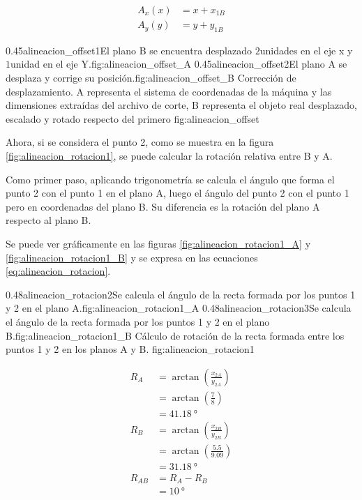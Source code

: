    \begin{equation}
      \begin{aligned}
         A_x(x) &= x+x_{1B} \\
         A_y(y) &= y+y_{1B}
      \end{aligned}
      \label{eq:alineacion_offset}
   \end{equation}

\subfigab
         {0.45}{alineacion_offset1}{El plano B se encuentra desplazado $2$unidades en el eje x y $1$unidad en el eje Y.}{fig:alineacion_offset_A}
         {0.45}{alineacion_offset2}{El plano A se desplaza y corrige su posición.}{fig:alineacion_offset_B}
         {Corrección de desplazamiento. A representa el sistema de coordenadas de la máquina y las dimensiones extraídas del archivo de corte, B representa el objeto real desplazado, escalado y rotado respecto del primero}
         {fig:alineacion_offset}

         Ahora, si se considera el punto 2, como se muestra en la figura \ref{fig:alineacion_rotacion1}, se puede calcular la rotación relativa entre B y A.\par
         Como primer paso, aplicando trigonometría se calcula el ángulo que forma el punto 2 con el punto 1 en el plano A, luego el ángulo del punto 2 con el punto 1 pero en coordenadas del plano B.
         Su diferencia es la rotación del plano A respecto al plano B.\par
         Se puede ver gráficamente en las figuras \ref{fig:alineacion_rotacion1_A} y \ref{fig:alineacion_rotacion1_B} y se expresa en las ecuaciones \ref{eq:alineacion_rotacion}.

\subfigab
            {0.48}{alineacion_rotacion2}{Se calcula el ángulo de la recta formada por los puntos 1 y 2 en el plano A.}{fig:alineacion_rotacion1_A}
            {0.48}{alineacion_rotacion3}{Se calcula el ángulo de la recta formada por los puntos 1 y 2 en el plano B.}{fig:alineacion_rotacion1_B}
            {Cálculo de rotación de la recta formada entre los puntos 1 y 2 en los planos A y B.}
            {fig:alineacion_rotacion1}

   \begin{equation}
      \begin{aligned}
         R_A &= \arctan(\frac{x_{2A}}{y_{2A}}) \\
         &= \arctan(\frac{7}{8}) \\
         &= \SI{41.18}{\degree}\\
         R_B &= \arctan(\frac{x_{2B}}{y_{2B}})\\
         &= \arctan(\frac{5.5}{9.09}) \\
         &= \SI{31.18}{\degree}\\
         R_{AB} &= R_A - R_B\\
         &= \SI{10}{\degree}
      \end{aligned}
      \label{eq:alineacion_rotacion}
   \end{equation}


